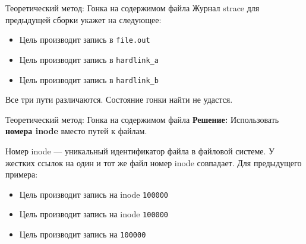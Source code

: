     \begin{frame}{Теоретический метод: Гонка на содержимом файла}
        Журнал strace для предыдущей сборки укажет на следующее:

        \begin{itemize}
            \item Цель  производит запись в \texttt{file.out}
            \item Цель  производит запись в \texttt{hardlink\_a}
            \item Цель  производит запись в \texttt{hardlink\_b}
        \end{itemize}

        Все три пути различаются. Состояние гонки найти не удастся.


    \end{frame}

    \begin{frame}{Теоретический метод: Гонка на содержимом файла}
        \textbf{Решение:} Использовать \textbf{номера inode} вместо путей к файлам.

        Номер inode --- уникальный идентификатор файла в файловой системе. У жестких ссылок на один и тот же файл номер inode совпадает. Для предыдущего примера:

        \begin{itemize}
            \item Цель  производит запись на inode \texttt{100000}
            \item Цель  производит запись на inode \texttt{100000}
            \item Цель  производит запись на \texttt{100000}
        \end{itemize}

    \end{frame}

